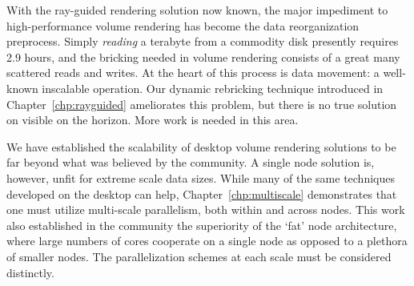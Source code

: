 With the ray-guided rendering solution now known, the major impediment
to high-performance volume rendering has become the data reorganization
preprocess.  Simply \emph{reading} a terabyte from a commodity disk
presently requires \tjftilde{}2.9 hours, and the bricking needed in volume
rendering consists of a great many scattered reads and writes.  At
the heart of this process is data movement: a well-known inscalable
operation.  Our dynamic rebricking technique introduced in
Chapter~\ref{chp:rayguided} ameliorates this problem, but there is no
true solution on visible on the horizon.  More work is needed in this
area.


We have established the scalability of desktop volume rendering
solutions to be far beyond what was believed by the community.  A
single node solution is, however, unfit for extreme scale data sizes.
While many of the same techniques developed on the desktop can help,
Chapter~\ref{chp:multiscale} demonstrates that one must utilize
multi-scale parallelism, both within and across nodes.  This work
also established in the community the superiority of the `fat' node
architecture, where large numbers of cores cooperate on a single node
as opposed to a plethora of smaller nodes.  The parallelization schemes
at each scale must be considered distinctly.


